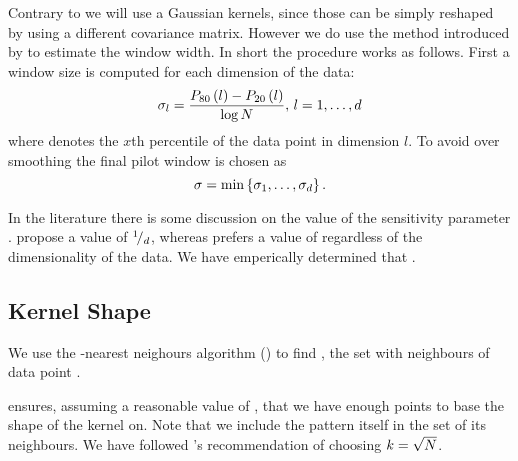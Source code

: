 
Contrary to \citeauthor{ferdosi2011comparison} we will use a Gaussian kernels, since those can be simply reshaped by using a different covariance matrix. However we do use the method introduced by \citeauthor{ferdosi2011comparison} to estimate the window width. In short the procedure works as follows. First a window size is computed for each dimension of the data:
\begin{equation}
	\sigma_l = \frac{P_{80}\left( l \right) - P_{20}\left( l \right)}{\log N},\, l = 1, \dotsc, d
\end{equation}
where  denotes the $x$th percentile of the data point in dimension $l$. To avoid over smoothing the final pilot window \varBandwidth is chosen as
\begin{equation}
	\sigma = \min\left\{\sigma_1, \dotsc, \sigma_d \right\}.
\end{equation}

In the literature there is some discussion on the value of the sensitivity parameter \varMBESensitivityParam. \citeauthor{breiman1977variable} propose a value of ${}^{1}\!/_{d}$, whereas \citeauthor{silverman1986density} prefers a value of  regardless of the dimensionality of the data. We have emperically determined that .

\subsection{Kernel Shape}
	We use the \KNNK-nearest neighours algorithm (\KNN) to find \varNeighbourhood{\KNNK}{\varPattern}, the set with \KNNK neighbours of data point \varPattern.

	\KNN ensures, assuming a reasonable value of \KNNK, that we have enough points to base the shape of the kernel on. Note that we include the pattern itself in the set of its \KNNK neighbours. We have followed \citeauthor{silverman1986density}'s recommendation of choosing $k = \sqrt{N}$. 

